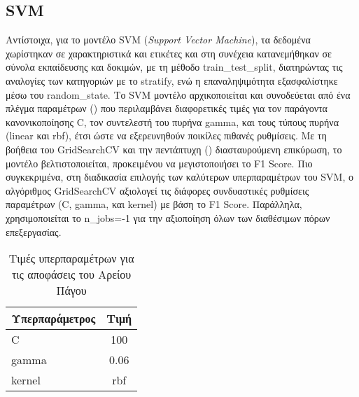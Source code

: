 \documentclass[diploma]{softlab-thesis}
\begin{document}
\begin{enumerate}
\begin{enumerate}





\subsection{SVM}

Αντίστοιχα, για το μοντέλο SVM (\textit{Support Vector Machine}), τα δεδομένα χωρίστηκαν σε χαρακτηριστικά και ετικέτες και στη συνέχεια κατανεμήθηκαν σε σύνολα εκπαίδευσης και δοκιμών, με τη μέθοδο train\_test\_split, διατηρώντας τις αναλογίες των κατηγοριών με το stratify, ενώ η επαναληψιμότητα εξασφαλίστηκε μέσω του random\_state. Το SVM μοντέλο αρχικοποιείται και συνοδεύεται από ένα πλέγμα παραμέτρων () που περιλαμβάνει διαφορετικές τιμές για τον παράγοντα κανονικοποίησης C, τον συντελεστή του πυρήνα gamma, και τους τύπους πυρήνα (linear και rbf), έτσι ώστε να εξερευνηθούν ποικίλες πιθανές ρυθμίσεις. Με τη βοήθεια του GridSearchCV και την πεντάπτυχη () διασταυρούμενη επικύρωση, το μοντέλο βελτιστοποιείται, προκειμένου να μεγιστοποιήσει το F1 Score. Πιο συγκεκριμένα, στη διαδικασία επιλογής των καλύτερων υπερπαραμέτρων του SVM, ο αλγόριθμος GridSearchCV αξιολογεί τις διάφορες συνδυαστικές ρυθμίσεις παραμέτρων (C, gamma, και kernel) με βάση το F1 Score. Παράλληλα, χρησιμοποιείται το n\_jobs=-1 για την αξιοποίηση όλων των διαθέσιμων πόρων επεξεργασίας. 


\begin{table}[h!]
\centering
\begin{tabular}{|l|c|}
\hline
\rowcolor[HTML]{FFFFFF} 
\textbf{Υπερπαράμετρος}      & \textbf{Τιμή}    \\ \hline
C           & 100 \\ \hline
gamma         &  0.06    \\ \hline
kernel  & rbf       \\ \hline
\end{tabular}
\caption{Τιμές υπερπαραμέτρων για τις αποφάσεις του Αρείου Πάγου}
\end{table}


\end{enumerate}
\end{enumerate}
\end{document}
